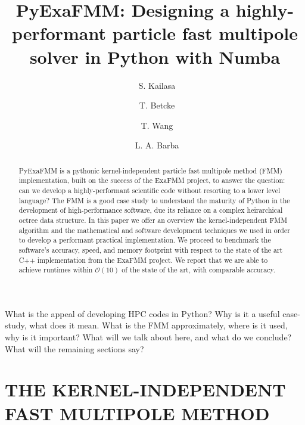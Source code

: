 \documentclass{IEEEcsmag}
\begin{document}

\title{PyExaFMM: Designing a highly-performant particle fast multipole solver in Python with Numba}

\author{\ S. Kailasa}

\author{\ T. Betcke}

\author{\ T. Wang}

\author{\ L. A. Barba}


\begin{abstract}
PyExaFMM is a pythonic kernel-independent particle fast multipole method (FMM) implementation, built on the success of the ExaFMM project, to answer the question: can we develop a highly-performant scientific code without resorting to a lower level language? The FMM is a good case study to understand the maturity of Python in the development of high-performance software, due its reliance on a complex heirarchical octree data structure. In this paper we offer an overview the kernel-independent FMM algorithm and the mathematical and software development techniques we used in order to develop a performant practical implementation. We proceed to benchmark the software's accuracy, speed, and memory footprint with respect to the state of the art C++ implementation from the ExaFMM project. We report that we are able to achieve runtimes within $\mathcal{O}(10)$ of the state of the art, with comparable accuracy.

\end{abstract}

\maketitle

 What is the appeal of developing HPC codes in Python? Why is it a useful case-study, what does it mean. What is the FMM approximately, where is it used, why is it important? What will we talk about here, and what do we conclude? What will the remaining sections say?


\section{THE KERNEL-INDEPENDENT FAST MULTIPOLE METHOD}
\end{document}
